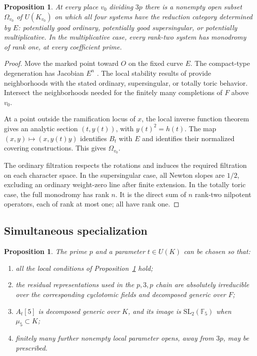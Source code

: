 \documentclass[11pt,a4paper]{article}
\newtheorem{proposition}[theorem]{Proposition}
\numberwithin{equation}{section}
\begin{document}
\begin{proposition}\label{prop:2.2}
At every place \(v_0\) dividing \(3p\) there is a nonempty open subset \(\Omega_{v_0}\) of \(U(K_{v_0})\) on which all four systems have the reduction category determined by \(E\): potentially good ordinary, potentially good supersingular, or potentially multiplicative. In the multiplicative case, every rank-two system has monodromy of rank one, at every coefficient prime.
\end{proposition}

\begin{proof}
Move the marked point toward \(O\) on the fixed curve \(E\). The compact-type degeneration has Jacobian \(E^n\) \cite[Proposition~3.3]{O}. The local stability results of \cite[\S7]{O} provide neighborhoods with the stated ordinary, supersingular, or totally toric behavior. Intersect the neighborhoods needed for the finitely many completions of \(F\) above \(v_0\).

At a point outside the ramification locus of \(x\), the local inverse function theorem gives an analytic section \((t,y(t))\), with \(y(t)^2=h(t)\). The map \((x,y)\mapsto(x,y(t)y)\) identifies \(B_t\) with \(E\) and identifies their normalized covering constructions. This gives \(\Omega_{v_0}\).

The ordinary filtration respects the rotations and induces the required filtration on each character space. In the supersingular case, all Newton slopes are \(1/2\), excluding an ordinary weight-zero line after finite extension. In the totally toric case, the full monodromy has rank \(n\). It is the direct sum of \(n\) rank-two nilpotent operators, each of rank at most one; all have rank one.
\end{proof}

\subsection*{Simultaneous specialization}

\begin{proposition}\label{prop:2.3}
The prime \(p\) and a parameter \(t\in U(K)\) can be chosen so that:
\begin{enumerate}
\item all the local conditions of Proposition~\ref{prop:2.2} hold;
\item the residual representations used in the \(p,3,p\) chain are absolutely irreducible over the corresponding cyclotomic fields and decomposed generic over \(F\);
\item \(A_t[5]\) is decomposed generic over \(K\), and its image is \(\mathrm{SL}_2(\mathbb F_5)\) when \(\mu_5\subset K\);
\item finitely many further nonempty local parameter opens, away from \(3p\), may be prescribed.
\end{enumerate}
\end{proposition}
\end{document}
